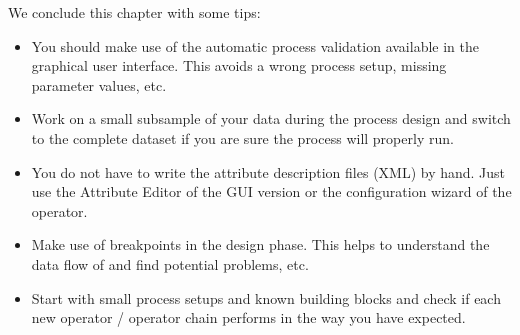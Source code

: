 We conclude this chapter with some tips:
\begin{itemize}
\item You should make use of the automatic process validation available in
  the graphical user interface. This avoids a wrong process setup, missing
  parameter values, etc.
\item Work on a small subsample of your data during the process design and
  switch to the complete dataset if you are sure the process will properly
  run.
\item You do not have to write the attribute description files (XML) by
  hand. Just use the Attribute Editor of the GUI version or the configuration
  wizard of the  operator.
\item Make use of breakpoints in the design phase. This helps to understand
  the data flow of \rapidminer and find potential problems, etc.
\item Start with small process setups and known building blocks and check if each
  new operator / operator chain performs in the way you have expected. 
\end{itemize}

